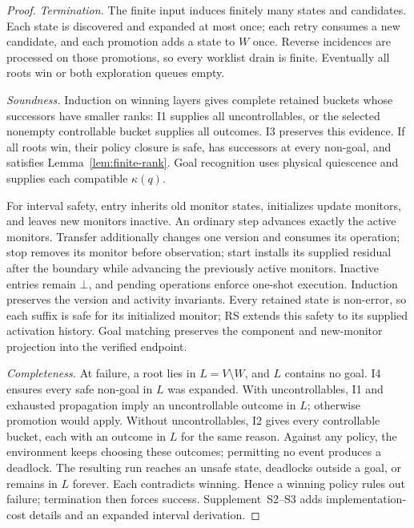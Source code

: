\documentclass[acmsmall,screen,review,anonymous]{acmart}
\begin{document}
\begin{proof}
\emph{Termination.} The finite input induces finitely many states and candidates. Each state is discovered and expanded at most once; each retry consumes a new candidate, and each promotion adds a state to $W$ once. Reverse incidences are processed on those promotions, so every worklist drain is finite. Eventually all roots win or both exploration queues empty.

\emph{Soundness.} Induction on winning layers gives complete retained buckets whose successors have smaller ranks: I1 supplies all uncontrollables, or the selected nonempty controllable bucket supplies all outcomes. I3 preserves this evidence. If all roots win, their policy closure is safe, has successors at every non-goal, and satisfies Lemma~\ref{lem:finite-rank}. Goal recognition uses physical quiescence and supplies each compatible $\kappa(q)$.

For interval safety, entry inherits old monitor states, initializes update monitors, and leaves new monitors inactive. An ordinary step advances exactly the active monitors. Transfer additionally changes one version and consumes its operation; stop removes its monitor before observation; start installs its supplied residual after the boundary while advancing the previously active monitors. Inactive entries remain $\bot$, and pending operations enforce one-shot execution. Induction preserves the version and activity invariants. Every retained state is non-error, so each suffix is safe for its initialized monitor; RS extends this safety to its supplied activation history. Goal matching preserves the component and new-monitor projection into the verified endpoint.

\emph{Completeness.} At failure, a root lies in $L=V\setminus W$, and $L$ contains no goal. I4 ensures every safe non-goal in $L$ was expanded. With uncontrollables, I1 and exhausted propagation imply an uncontrollable outcome in $L$; otherwise promotion would apply. Without uncontrollables, I2 gives every controllable bucket, each with an outcome in $L$ for the same reason. Against any policy, the environment keeps choosing these outcomes; permitting no event produces a deadlock. The resulting run reaches an unsafe state, deadlocks outside a goal, or remains in $L$ forever. Each contradicts winning. Hence a winning policy rules out failure; termination then forces success. Supplement~S2--S3 adds implementation-cost details and an expanded interval derivation.
\end{proof}
\end{document}
